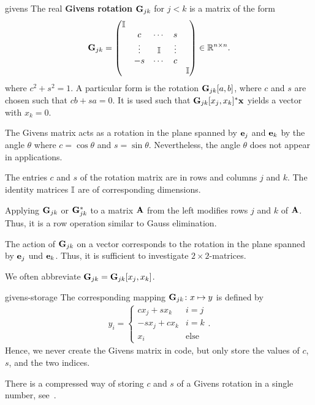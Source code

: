 \begin{Definition}{givens}
  The real \textbf{Givens rotation}
  $\mathbf G_{jk}$ for $j<k$ is a matrix of the form
  \begin{gather}
      \mathbf G_{jk} =
    \begin{pmatrix}
      \mathbb I \\
      &c&\cdots&s\\
      &\vdots&\mathbb I &\vdots\\
      &-s&\cdots&c\\
      &&&&\mathbb I
    \end{pmatrix}
    \in\mathbb R^{n\times n}.
  \end{gather}
  where $c^2+s^2 = 1$. A particular form is the rotation
  $\mathbf G_{jk}[a,b]$, where $c$ and $s$ are chosen such that
  $cb+sa=0$. It is used such that $\mathbf G_{jk}[x_j,x_k]^* \mathbf x$ yields a
  vector with $x_k=0$.
\end{Definition}

\begin{remark}
  The Givens matrix acts as a rotation in the plane spanned by $\mathbf e_j$
  and $\mathbf e_k$ by the angle $\theta$ where $c=\cos\theta$ and
  $s=\sin\theta$. Nevertheless, the angle $\theta$ does not appear in
  applications.

  The entries $c$ and $s$ of the rotation matrix are in rows and
  columns $j$ and $k$.  The identity matrices $\mathbb I$ are of
  corresponding dimensions.

  Applying $\mathbf G_{jk}$ or $\mathbf G_{jk}^*$ to a matrix $\mathbf A$ from
  the left modifies rows $j$ and $k$ of $\mathbf A$. Thus, it is a row
  operation similar to Gauss elimination.

  The action of $\mathbf G_{jk}$ on a vector corresponds to the rotation
  in the plane spanned by $\mathbf e_j$ und $\mathbf e_k$. Thus, it is sufficient
  to investigate $2\times2$-matrices.

  We often abbreviate $\mathbf G_{jk} = \mathbf G_{jk}[x_j,x_k]$.
\end{remark}

\begin{Remark}{givens-storage}
  The corresponding mapping $\mathbf G_{jk}\colon x\mapsto y$ is defined by
  \begin{gather}
    y_i =
    \begin{cases}
      c x_j + s x_k & i=j\\
      -s x_j + c x_k & i=k\\
      x_i &\text{else}
    \end{cases}.
  \end{gather}
  Hence, we never create the Givens matrix in code, but only store the
  values of $c$, $s$, and the two indices.

  There is a compressed way of storing $c$ and $s$ of a Givens
  rotation in a single number, see~\cite[5.1.11]{GolubVanLoan83}.
\end{Remark}

